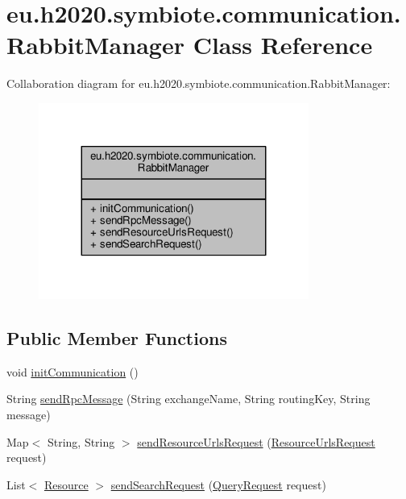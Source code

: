 \hypertarget{classeu_1_1h2020_1_1symbiote_1_1communication_1_1RabbitManager}{}\section{eu.\+h2020.\+symbiote.\+communication.\+Rabbit\+Manager Class Reference}
\label{classeu_1_1h2020_1_1symbiote_1_1communication_1_1RabbitManager}


Collaboration diagram for eu.\+h2020.\+symbiote.\+communication.\+Rabbit\+Manager\+:
\nopagebreak
\begin{figure}[H]
\begin{center}
\leavevmode
\includegraphics[width=251pt]{classeu_1_1h2020_1_1symbiote_1_1communication_1_1RabbitManager__coll__graph}
\end{center}
\end{figure}
\subsection*{Public Member Functions}
\begin{DoxyCompactItemize}
\item 
void \hyperlink{classeu_1_1h2020_1_1symbiote_1_1communication_1_1RabbitManager_a30abf6a670122eb22a8105a206858616}{init\+Communication} ()
\item 
String \hyperlink{classeu_1_1h2020_1_1symbiote_1_1communication_1_1RabbitManager_a822ebbed01755311ca9038bb7fa43591}{send\+Rpc\+Message} (String exchange\+Name, String routing\+Key, String message)
\item 
Map$<$ String, String $>$ \hyperlink{classeu_1_1h2020_1_1symbiote_1_1communication_1_1RabbitManager_a56ce4aea24a797b642a52a3071acf0cb}{send\+Resource\+Urls\+Request} (\hyperlink{classeu_1_1h2020_1_1symbiote_1_1model_1_1ResourceUrlsRequest}{Resource\+Urls\+Request} request)
\item 
List$<$ \hyperlink{classeu_1_1h2020_1_1symbiote_1_1model_1_1Resource}{Resource} $>$ \hyperlink{classeu_1_1h2020_1_1symbiote_1_1communication_1_1RabbitManager_ad61f8d511d62197ce15bc1e74a9f8e9c}{send\+Search\+Request} (\hyperlink{classeu_1_1h2020_1_1symbiote_1_1model_1_1QueryRequest}{Query\+Request} request)
\end{DoxyCompactItemize}


